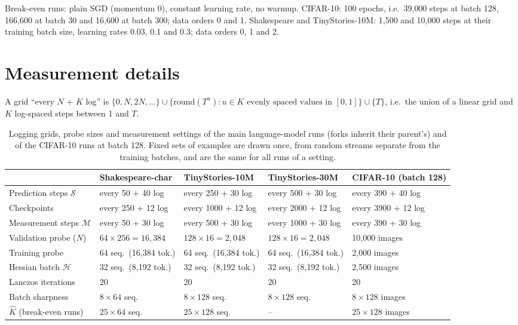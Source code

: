 \documentclass[10pt]{article}
\newcommand{\cS}{\mathcal{S}}
\newcommand{\cM}{\mathcal{M}}
\begin{document}
Break-even runs: plain SGD (momentum 0), constant learning rate, no warmup. CIFAR-10: 100 epochs, i.e.\
39{,}000 steps at batch 128, 166{,}600 at batch 30 and 16{,}600 at batch 300; data orders 0 and 1.
Shakespeare and TinyStories-10M: 1{,}500 and 10{,}000 steps at their training batch size, learning rates 0.03,
0.1 and 0.3; data orders 0, 1 and 2.

\section{Measurement details}
\label{app:measure}

A grid ``every $N$ + $K$ log'' is $\{0,N,2N,\dots\}\cup\{\mathrm{round}(T^{u}):u\in\text{$K$ evenly spaced
values in }[0,1]\}\cup\{T\}$, i.e.\ the union of a linear grid and $K$ log-spaced steps between 1 and $T$.

\begin{table}[ht]
\centering\small
\caption{Logging grids, probe sizes and measurement settings of the main language-model runs (forks inherit their parent's) and of the CIFAR-10 runs at batch 128.
Fixed sets of examples are drawn once, from random streams separate from the training batches, and are the
same for all runs of a setting.}
\label{tab:grids}
\begin{tabular}{@{}lllll@{}}
\toprule
 & Shakespeare-char & TinyStories-10M & TinyStories-30M & CIFAR-10 (batch 128) \\
\midrule
Prediction steps $\cS$ & every 50 + 40 log & every 250 + 30 log & every 500 + 30 log & every 390 + 40 log \\
Checkpoints & every 250 + 12 log & every 1000 + 12 log & every 2000 + 12 log & every 3900 + 12 log \\
Measurement steps $\cM$ & every 50 + 30 log & every 500 + 30 log & every 1000 + 30 log & every 390 + 30 log \\
Validation probe ($N$) & $64\times256=16{,}384$ & $128\times16=2{,}048$ & $128\times16=2{,}048$ & 10{,}000 images \\
Training probe & 64 seq.\ (16{,}384 tok.) & 64 seq.\ (16{,}384 tok.) & 64 seq.\ (16{,}384 tok.) & 2{,}000 images \\
Hessian batch $\mathcal H$ & 32 seq.\ (8{,}192 tok.) & 32 seq.\ (8{,}192 tok.) & 32 seq.\ (8{,}192 tok.) & 2{,}500 images \\
Lanczos iterations & 20 & 20 & 20 & 20 \\
Batch sharpness & $8\times64$ seq. & $8\times128$ seq. & $8\times128$ seq. & $8\times128$ images \\
$\hat K$ (break-even runs) & $25\times64$ seq. & $25\times128$ seq. & -- & $25\times128$ images \\
\bottomrule
\end{tabular}
\end{table}
\end{document}
